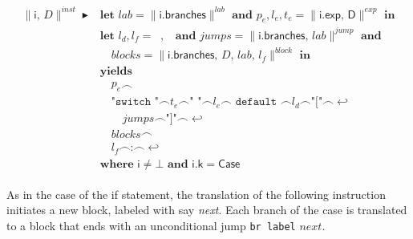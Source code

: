 \documentclass{article}
\newcommand{\trad}[2]{\ensuremath{\lVert \textsf{#1} \rVert^{\textit{#2}}}}
\newcommand{\nl}[0]{\ensuremath{\hookleftarrow}}
\DeclareMathOperator{\conc}{\smallfrown}
\DeclareMathOperator{\isdef}{\blacktriangleright}
\DeclareMathOperator{\name}{\mathcal{L}()}
\begin{document}
\begin{framed}
\begin{align}
\begin{split}
  \trad{i, $D$}{inst} \isdef 
  & \textbf{let } lab = \trad{i.branches}{lab} \textbf{ and } p_e, l_e, t_e = \trad{i.exp, D}{exp} \textbf{ in} \\
  & \textbf{let } l_d, l_f = \name, \name \textbf{ and } 
  jumps = \trad{i.branches, $lab$}{jump} \textbf{ and }  \\
  & \quad blocks = \trad{i.branches, $D$, $lab$, $l_f$}{block} \textbf{ in}  \\
  & \textbf{yields }  \\
  & \quad p_e \conc  \\
  & \quad \texttt{"switch "} \conc t_e \conc \texttt{" "} \conc l_e \conc 
  \texttt{ default } \conc l_d \conc \texttt{"["} \conc \nl  \\
  & \quad \quad jumps \conc \texttt{"]"} \conc \nl  \\
  & \quad blocks \conc  \\
  & \quad l_f \conc \texttt{:} \conc \nl  \\
  & \textbf{where } \textsf{i} \ne \bot \textbf{ and } \textsf{i.k} = \textsf{Case}
\end{split}
\end{align}
\end{framed}

As in the case of the if statement, the translation of the following 
instruction initiates a new block, labeled with say \textit{next}. 
Each branch of the case is translated to a block that ends with
an unconditional jump \verb'br label' $\textit{next}$.


\end{document}
